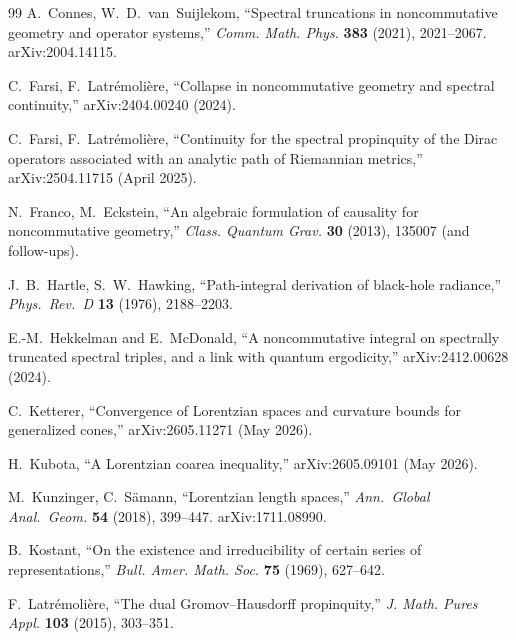 \documentclass[11pt,a4paper]{article}
\theoremstyle{plain}
\theoremstyle{definition}
\begin{document}
\begin{thebibliography}{99}
A.~Connes, W.~D.~van~Suijlekom, ``Spectral truncations in
noncommutative geometry and operator systems,''
\emph{Comm. Math. Phys.} \textbf{383} (2021), 2021--2067.
arXiv:2004.14115.

C.~Farsi, F.~Latr\'emoli\`ere, ``Collapse in noncommutative geometry
and spectral continuity,'' arXiv:2404.00240 (2024).

C.~Farsi, F.~Latr\'emoli\`ere, ``Continuity for the spectral
propinquity of the Dirac operators associated with an analytic path
of Riemannian metrics,'' arXiv:2504.11715 (April 2025).

N.~Franco, M.~Eckstein, ``An algebraic formulation of causality for
noncommutative geometry,''
\emph{Class. Quantum Grav.} \textbf{30} (2013), 135007 (and follow-ups).

J.~B.~Hartle, S.~W.~Hawking, ``Path-integral derivation of black-hole
radiance,'' \emph{Phys.~Rev.~D} \textbf{13} (1976), 2188--2203.

E.-M.~Hekkelman and E.~McDonald, ``A noncommutative integral on
spectrally truncated spectral triples, and a link with quantum
ergodicity,'' arXiv:2412.00628 (2024).

C.~Ketterer, ``Convergence of Lorentzian spaces and curvature bounds
for generalized cones,'' arXiv:2605.11271 (May 2026).

H.~Kubota, ``A Lorentzian coarea inequality,'' arXiv:2605.09101
(May 2026).

M.~Kunzinger, C.~S\"amann, ``Lorentzian length spaces,''
\emph{Ann.~Global Anal.~Geom.} \textbf{54} (2018), 399--447.
arXiv:1711.08990.

B.~Kostant, ``On the existence and irreducibility of certain series
of representations,'' \emph{Bull. Amer. Math. Soc.} \textbf{75}
(1969), 627--642.

F.~Latr\'emoli\`ere, ``The dual Gromov--Hausdorff propinquity,''
\emph{J. Math. Pures Appl.} \textbf{103} (2015), 303--351.


\end{thebibliography}
\end{document}
